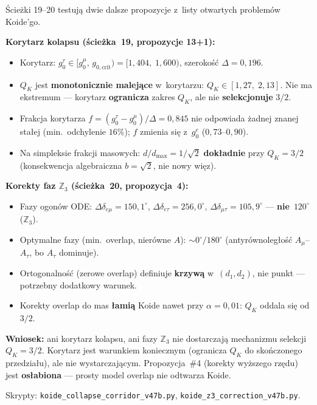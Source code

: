 \begin{remark}%
\label{rem:T-collapse-corridor}
\'Scie\.zki 19--20 testuj\k{a} dwie dalsze propozycje z~listy
otwartych problem\'ow Koide'go.

\medskip\noindent
\textbf{Korytarz kolapsu (\'scie\.zka~19, propozycje 13+1):}
\begin{itemize}[nosep]
  \item Korytarz: $g_0^\tau \in [g_0^\mu,\, g_{0,\mathrm{crit}})
    = [1{,}404,\; 1{,}600)$, szeroko\'s\'c $\Delta = 0{,}196$.
  \item $Q_K$ jest \textbf{monotonicznie malej\k{a}ce}
    w~korytarzu: $Q_K \in [1{,}27,\; 2{,}13]$.
    Nie ma ekstremum --- korytarz \textbf{ogranicza} zakres
    $Q_K$, ale nie \textbf{selekcjonuje} $3/2$.
  \item Frakcja korytarza $f = (g_0^\tau{-}g_0^\mu)/\Delta = 0{,}845$
    nie odpowiada \.zadnej znanej sta\l{}ej (min.\ odchylenie $16\%$);
    $f$ zmienia si\k{e} z~$g_0^e$ ($0{,}73$--$0{,}90$).
  \item Na simpleksie frakcji masowych: $d/d_{\max} = 1/\sqrt{2}$
    \textbf{dok\l{}adnie} przy $Q_K = 3/2$
    (konsekwencja algebraiczna $b = \sqrt{2}$, nie nowy wi\k{e}z).
\end{itemize}

\medskip\noindent
\textbf{Korekty faz $\mathbb{Z}_3$ (\'scie\.zka~20, propozycja~4):}
\begin{itemize}[nosep]
  \item Fazy ogon\'ow ODE: $\Delta\delta_{e\mu} = 150{,}1^\circ$,
    $\Delta\delta_{e\tau} = 256{,}0^\circ$,
    $\Delta\delta_{\mu\tau} = 105{,}9^\circ$
    --- \textbf{nie}~$120^\circ$ ($\mathbb{Z}_3$).
  \item Optymalne fazy (min.\ overlap, nier\'owne $A$):
    $\sim 0^\circ / 180^\circ$ (antyr\'ownoleg\l{}o\'s\'c
    $A_\mu$--$A_\tau$, bo $A_\tau$ dominuje).
  \item Ortogonalno\'s\'c (zerowe overlap)
    definiuje \textbf{krzyw\k{a}} w~$(d_1,d_2)$,
    nie punkt --- potrzebny dodatkowy warunek.
  \item Korekty overlap do mas \textbf{\l{}ami\k{a}} Koide
    nawet przy $\alpha = 0{,}01$: $Q_K$ oddala si\k{e} od $3/2$.
\end{itemize}

\medskip\noindent
\textbf{Wniosek:} ani korytarz kolapsu, ani fazy $\mathbb{Z}_3$
nie dostarczaj\k{a} mechanizmu selekcji $Q_K = 3/2$.
Korytarz jest warunkiem koniecznym (ogranicza $Q_K$ do sko\'nczonego
przedzia\l{}u), ale nie wystarczaj\k{a}cym.
Propozycja~\#4 (korekty wy\.zszego rz\k{e}du) jest
\textbf{os\l{}abiona} --- prosty model overlap nie odtwarza Koide.

Skrypty: \texttt{koide\_collapse\_corridor\_v47b.py},
\texttt{koide\_z3\_correction\_v47b.py}.
\end{remark}

